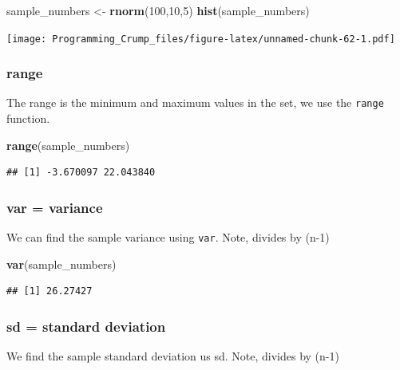 \documentclass[]{book}
\newenvironment{Shaded}{\begin{snugshade}}{\end{snugshade}}
\newcommand{\KeywordTok}[1]{\textcolor[rgb]{0.13,0.29,0.53}{\textbf{{#1}}}}
\newcommand{\DecValTok}[1]{\textcolor[rgb]{0.00,0.00,0.81}{{#1}}}
\newcommand{\StringTok}[1]{\textcolor[rgb]{0.31,0.60,0.02}{{#1}}}
\newcommand{\NormalTok}[1]{{#1}}
\theoremstyle{definition}
\theoremstyle{definition}
\theoremstyle{definition}
\theoremstyle{remark}
\begin{document}
\begin{Shaded}
\begin{Highlighting}[]
\NormalTok{sample_numbers <-}\StringTok{ }\KeywordTok{rnorm}\NormalTok{(}\DecValTok{100}\NormalTok{,}\DecValTok{10}\NormalTok{,}\DecValTok{5}\NormalTok{)}
\KeywordTok{hist}\NormalTok{(sample_numbers)}
\end{Highlighting}
\end{Shaded}

\texttt{[image: Programming\_Crump\_files/figure-latex/unnamed-chunk-62-1.pdf]}

\subsubsection{range}\label{range}

The range is the minimum and maximum values in the set, we use the
\texttt{range} function.

\begin{Shaded}
\begin{Highlighting}[]
\KeywordTok{range}\NormalTok{(sample_numbers)}
\end{Highlighting}
\end{Shaded}

\begin{verbatim}
## [1] -3.670097 22.043840
\end{verbatim}

\subsubsection{var = variance}\label{var-variance}

We can find the sample variance using \texttt{var}. Note, divides by
(n-1)

\begin{Shaded}
\begin{Highlighting}[]
\KeywordTok{var}\NormalTok{(sample_numbers)}
\end{Highlighting}
\end{Shaded}

\begin{verbatim}
## [1] 26.27427
\end{verbatim}

\subsubsection{sd = standard deviation}\label{sd-standard-deviation}

We find the sample standard deviation us sd. Note, divides by (n-1)
\end{document}
